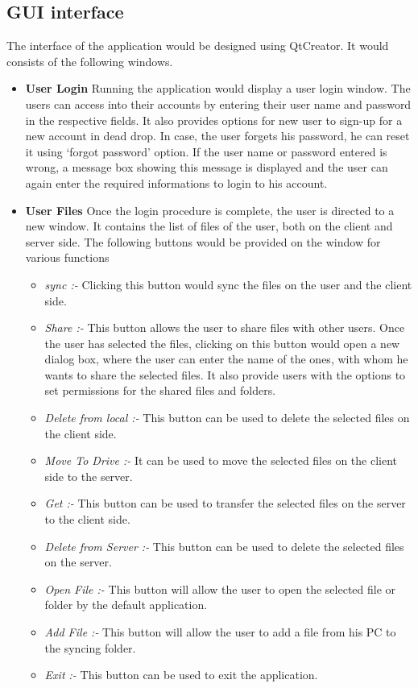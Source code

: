\documentclass{article}
\begin{document}
			\subsection{GUI interface} 
				The interface of the application would be designed using QtCreator. It would consists of the following windows.
				\begin{itemize}
					\item \textbf{User Login}
						\newline
						Running the application would display a user login window. The users can access into their accounts by entering their user name and password in the respective fields. It also provides options for new user to sign-up for a new account in dead drop. In case, the user forgets his password, he can reset it using `forgot password' option. If the user name or password entered is wrong, a message box showing this message is displayed and the user can again enter the required informations to login to his account. 
					 
					\item \textbf{User Files}
						\newline
						Once the login procedure is complete, the user is directed to a new window. It contains the list of files of the user, both on the client and server side. The following buttons would be provided on the window for various functions
					\begin{itemize}
						\item \textit{sync :-} Clicking this button would sync the files on the user and the client side.
						\item \textit{Share :-} This button allows the user to share files with other users. Once the user has selected the files, clicking on this button would open a new dialog box, where the user can enter the name of the ones, with whom he wants to share the selected files. It also provide users with the options to set permissions for the shared files and folders.
						\item \textit{Delete from local :-} This button can be used to delete the selected files on the client side.
						\item \textit{Move To Drive :-} It can be used to move the selected files on the client side to the server.
						\item \textit{Get :-} This button can be used to transfer the selected files on the server to the client side.
						\item \textit{Delete from Server :-} This button can be used to delete the selected files on the server.
						\item \textit{Open File :-} This button will allow the user to open the selected file or folder by the default application.
						\item \textit{Add File :-} This button will allow the user to add a file from his PC to the syncing folder.
						\item \textit{Exit :-} This button can be used to exit the application.
					\end{itemize} 
						

\end{itemize}
\end{document}
